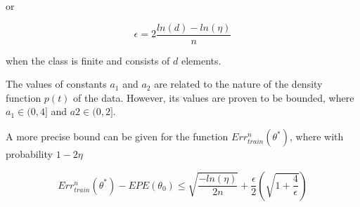 or 

\begin{equation}\label{vapnik-epsilonBound}
\epsilon = 2 \frac{ ln(d) - ln(\eta)}{n}
\end{equation}

when the class is finite and consists of $d$ elements.

The values of constants $a_1$ and $a_2$ are related to the nature of the density function $p(t)$ of the data. However, its values are proven to be bounded, where $a_1 \in (0,4 ]$ and $a2 \in (0,2 ]$. 


A more precise bound can be given for the function $Err^n_{train}(\theta^*)$, where with probability $1 - 2\eta$ 

\begin{equation}\label{vapnik-classificationBoundPrecise}
Err^n_{train}(\theta^*) - EPE(\theta_0) \leq  \sqrt{\frac{-ln(\eta)}{2n} } + \frac{\epsilon}{2}\left( \sqrt{1 + \frac{4}{\epsilon} } \right)
\end{equation}